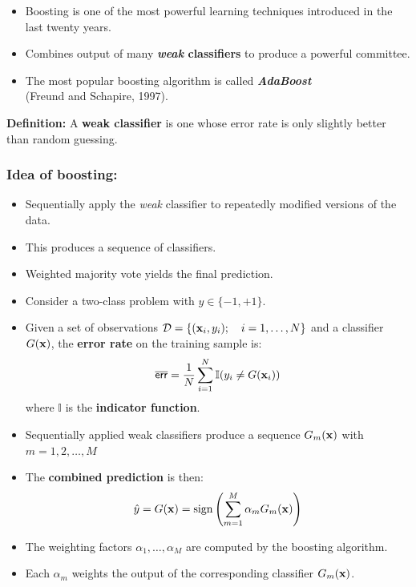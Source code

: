   \begin{itemize}
    \item Boosting is one of the most powerful learning techniques introduced in the last twenty years.
    \item Combines output of many \textbf {\textit{weak} classifiers} to produce a powerful committee.
    \item The most popular boosting algorithm is called \textbf {\textit{AdaBoost}} \\
      (Freund and Schapire, 1997).
  \end{itemize}
\textbf{Definition:} A \textbf {weak classifier} is one whose error rate is only slightly better than random guessing.

 \subsubsection{Idea of boosting:}

  \begin{itemize}
    \item Sequentially apply the \emph{weak} classifier to repeatedly modified versions of the data.
    \item This produces a sequence of classifiers.
    \item Weighted majority vote yields the final prediction.
    \item Consider a two-class problem with $y \in \{ -1, +1\}$.          %
    \item Given a set of observations $\mathcal{D} = \{(\bm{\mathrm{x}}_i, y_i); \quad i=1,\ldots,N\}$ and a classifier $G(\bm{\mathrm{x}})$, the \textbf  {error rate} on the training sample is:
      \begin{displaymath}
        {\mathop{\overline{\mathsf{err}}}} = \frac{1}{N} \sum_{i=1}^N \mathbb I(y_i \neq G(\bm{\mathrm{x}}_i))
      \end{displaymath}
      where $\mathbb I$ is the \textbf  {indicator function}.
    \item Sequentially applied weak classifiers produce a sequence $G_m(\bm{\mathrm{x}})$ with $m=1,2,\ldots,M$ %
    \item The \textbf{combined prediction} is then:
      \begin{displaymath}
        \hat y = G(\bm{\mathrm{x}}) = \operatorname{sign} \left( \sum_{m=1}^M \alpha_m G_m(\bm{\mathrm{x}}) \right)
      \end{displaymath}
    \item The weighting factors $\alpha_1, \ldots, \alpha_M$ are computed by the boosting algorithm. %
    \item Each $\alpha_m$ weights the output of the corresponding classifier $G_m(\bm{\mathrm{x}})$.
  \end{itemize}

